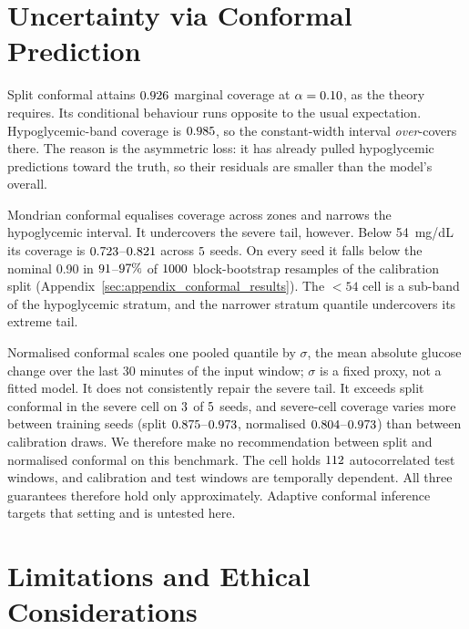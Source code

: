 \documentclass[pmlr,twocolumn,10pt]{jmlr}
\begin{document}
\section{Uncertainty via Conformal Prediction}
\label{sec:conformal_results}

Split conformal attains $0.926$ marginal coverage at $\alpha = 0.10$,
as the theory requires. Its conditional behaviour runs opposite to the usual
expectation. Hypoglycemic-band coverage is $0.985$, so the
constant-width interval \emph{over}-covers there. The reason is the asymmetric
loss: it has already pulled hypoglycemic predictions toward the truth, so their
residuals are smaller than the model's overall.

Mondrian conformal equalises coverage across zones and narrows the
hypoglycemic interval. It undercovers the severe tail, however. Below
54~mg/dL its coverage is $0.723$--$0.821$
across $5$ seeds. On every seed it falls below the nominal 0.90 in
$91$--$97\%$ of
$1000$ block-bootstrap resamples of the calibration split
(Appendix~\ref{sec:appendix_conformal_results}). The $<54$ cell is a sub-band of
the hypoglycemic stratum, and the narrower stratum quantile undercovers its
extreme tail.

Normalised conformal scales one pooled quantile by $\sigma$, the mean absolute
glucose change over the last 30 minutes of the input window; $\sigma$ is a
fixed proxy, not a fitted model. It does not consistently repair the severe
tail. It exceeds split conformal in the severe cell on
$3$ of $5$ seeds, and severe-cell coverage
varies more between training seeds (split
$0.875$--$0.973$, normalised
$0.804$--$0.973$) than between calibration
draws. We therefore make no recommendation between split and normalised
conformal on this benchmark. The cell holds $112$ autocorrelated
test windows, and calibration and test windows are temporally dependent. All
three guarantees therefore hold only approximately. Adaptive conformal
inference~\citep{gibbs2021adaptive} targets that setting and is untested here.

\section{Limitations and Ethical Considerations}
\end{document}
